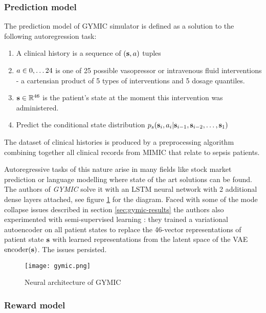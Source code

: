 \subsubsection{Prediction model}
The prediction model of GYMIC simulator is defined as a solution to the following autoregression task:
\begin{enumerate}
    \item A clinical history is a sequence of $(\textbf{s}, a)$ tuples
    \item $a \in 0,\dots 24$ is one of 25 possible vasopressor or intravenous fluid interventions - a cartensian product of 5 types of interventions and 5 dosage quantiles. 
    \item $\textbf{s} \in \mathbb{R}^{46}$ is the patient's state at the moment this intervention was administered.
    \item Predict the conditional state distribution $p_s(\textbf{s}_i, a_i | \textbf{s}_{i-1},\textbf{s}_{i-2},\dots,\textbf{s}_1)$
\end{enumerate}

The dataset of clinical histories is produced by a preprocessing algorithm combining together all clinical records from MIMIC that relate to sepsis patients.

Autoregressive tasks of this nature arise in many fields like stock market prediction \cite{stonks1,stonks2} or language modelling \cite{langmodels} where state of the art solutions can be found.
The authors of \emph{GYMIC} solve it with an LSTM \cite{hochreiterLongShorttermMemory1997} neural network with 2 additional dense layers attached, see figure \ref{fig:gymic} for the diagram.
Faced with some of the mode collapse issues described in section \ref{sec:gymic-results} the authors also experimented with semi-supervised learning \cite{semi-supervised}: they trained a variational autoencoder \cite{vae} on all patient states to replace the 46-vector representations of patient state $\textbf{s}$ with learned representations from the latent space of the VAE $\text{encoder}(\textbf{s})$.
The issues persisted.

\begin{figure}
    \centering
    \texttt{[image: gymic.png]}
    \caption{Neural architecture of GYMIC}
    \label{fig:gymic}
\end{figure}

\subsubsection{Reward model}

